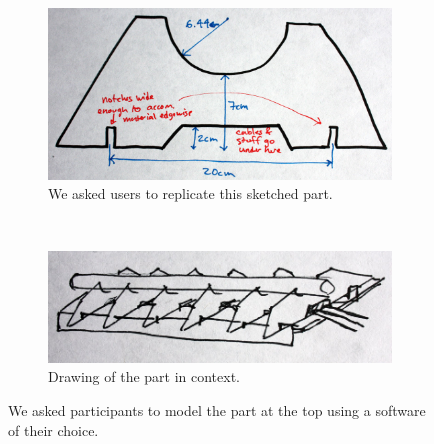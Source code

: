 \begin{figure}[t]
  \centering
  \begin{subfigure}[b]{0.7\textwidth}
    \centering
    \includegraphics[width=\textwidth]{img/laser-me-1.jpg}  
    \caption{We asked users to replicate this sketched part.}
    \label{fig:interview-sketch-1} 
  \end{subfigure}
  \\
  \vspace{12pt}
  \begin{subfigure}[b]{0.7\textwidth}
    \centering
    \includegraphics[width=\textwidth]{img/laser-me-2.jpg}  
    \caption{Drawing of the part in context.}
    \label{fig:interview-sketch-2} 
  \end{subfigure}
  \caption[Sketch from designer interview activity]{We asked
    participants to model the part at the top using a software of
    their choice.}
  \label{fig:interview-sketch}
\end{figure}
